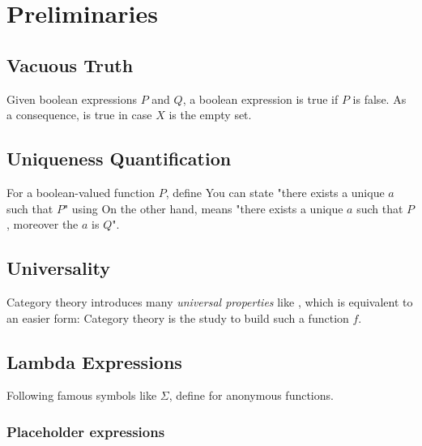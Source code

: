 \section{Preliminaries}

\subsection{Vacuous Truth}

Given boolean expressions $P$ and $Q$, a boolean expression
is true if $P$ is false.
As a consequence,
is true in case $X$ is the empty set.

\subsection{Uniqueness Quantification}

For a boolean-valued function $P$, define
You can state "there exists a unique $a$ such that $P$" using
On the other hand,
means "there exists a unique $a$ such that $P$, moreover the $a$ is $Q$".

\subsection{Universality}

Category theory introduces many \textit{universal properties} like 
, which is equivalent to an easier form:
Category theory is the study to build such a function $f$.


\subsection{Lambda Expressions}

Following famous symbols like $\Sigma$, define
for anonymous functions.

\subsubsection{Placeholder expressions}

